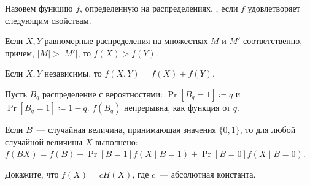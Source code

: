 Назовем функцию $f$, определенную на распределениях, , если $f$
удовлетворяет следующим свойствам.
\begin{enumtask}
    \item Если $X, Y$ равномерные распределения на множествах $M$ и $M'$ соответственно, причем, $|M| >
        |M'|$, то $f(X) > f(Y)$.
    \item Если $X, Y$ независимы, то $f(X, Y) = f(X) + f(Y)$.
    \item Пусть $B_q$ распределение с вероятностями: $\Pr[B_q = 1] \coloneqq q$ и $\Pr[B_q = 1] \coloneqq
        1 - q$. $f(B_q)$ непрерывна, как функция от $q$.
    \item Если $B$~--- случайная величина, принимающая значения $\{0, 1\}$, то для любой случайной
        величины $X$ выполнено: $f(BX) = f(B) + \Pr[B = 1] f(X \mid B = 1) + \Pr[B = 0] f(X \mid B = 0)$.
\end{enumtask}

Докажите, что $f(X) = c H(X)$, где $c$~--- абсолютная константа.
